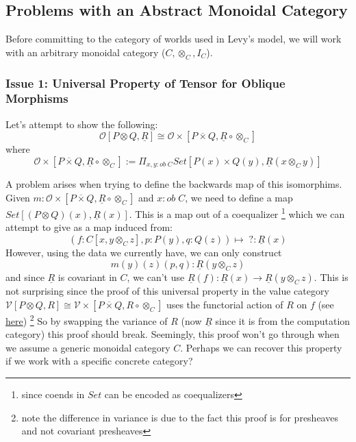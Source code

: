\documentclass{article}
\begin{document}
\subsection{Problems with an Abstract Monoidal Category}
Before committing to the category 
of worlds used in Levy's model, we will work with an arbitrary monoidal category ($C, \otimes_C , I_C$). 
\subsubsection{Issue 1: Universal Property of Tensor for Oblique Morphisms}
Let's attempt to show the following:
\[
  \mathcal{O}[P \otimes Q , \underline{R}] \cong \mathcal{O\times}[P \overline{\times} Q , \underline{R} \circ \otimes_C]  
\]
where 
\[
    \mathcal{O\times}[P \overline{\times} Q , \underline{R} \circ \otimes_C] 
    := \Pi_{x , y : ob \;C}Set[P(x)\times Q(y) , \underline{R}(x \otimes_C y)]
\]

A problem arises when trying to define the backwards map of this isomorphims. 
Given $m : \mathcal{O\times}[P \overline{\times} Q , \underline{R} \circ \otimes_C]$ and $x : ob \; C$, we need to define a map
$Set[(P \otimes Q)(x), \underline{R}(x)]$. This is a map out of a coequalizer 
\footnote{since coends in $Set$ can be encoded as coequalizers}
which we can attempt to give as a map induced from:
\[
    (f : C[x , y\otimes_C z] , p : P(y) , q : Q(z)) \mapsto \;? : \underline{R}(x)
\]
However, using the data we currently have, we can only construct
\[
    m(y)(z)(p,q) : \underline{R} (y \otimes_C z)    
\]
and since $\underline{R}$ is covariant in $C$, we can't use $\underline{R}(f) : \underline{R}(x) \rightarrow \underline{R}(y \otimes_C z)$.
This is not surprising since the proof of this universal property in the value category 
$\mathcal{V}[P \otimes Q , R] \cong \mathcal{V\times}[P \overline{\times} Q , R \circ \otimes_C]$
uses the functorial action of $R$ on $f$ 
(see \href{https://github.com/bond15/Bunched-CBPV/blob/d4de5ebe3a2a42499b24c13a8d2da7f3a2cc1b36/src/Data/BiDCC.agda#L120}{here})
\footnote{note the difference in variance is due to the fact this proof is for presheaves and not covariant presheaves}
So by swapping the variance of $R$ (now $\underline{R}$ since it is from the computation category) this proof should break.
Seemingly, this proof won't go through when we assume a generic monoidal category $C$. Perhaps we can recover this property if 
we work with a specific concrete category?
\end{document}
